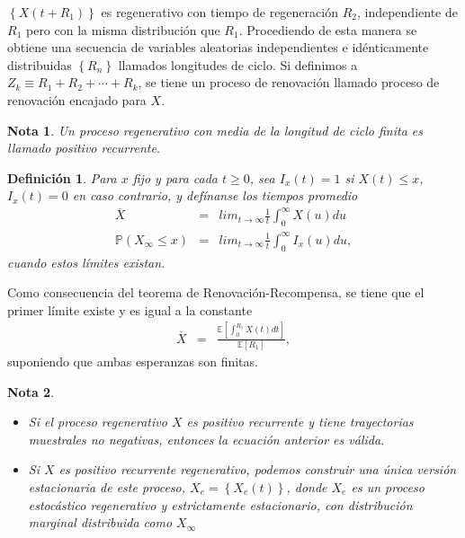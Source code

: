 \documentclass{article}
\newtheorem{Def}{Definición}[section]
\newtheorem{Note}{Nota}[section]
\newcommand{\esp}{\mathbb{E}}
\newcommand{\prob}{\mathbb{P}}
\numberwithin{equation}{section}
\begin{document}
$\left\{X\left(t+R_{1}\right)\right\}$ es regenerativo con tiempo de regeneraci\'on $R_{2}$, independiente de $R_{1}$ pero con la misma distribuci\'on que $R_{1}$. Procediendo de esta manera se obtiene una secuencia de variables aleatorias independientes e id\'enticamente distribuidas $\left\{R_{n}\right\}$ llamados longitudes de ciclo. Si definimos a $Z_{k}\equiv R_{1}+R_{2}+\cdots+R_{k}$, se tiene un proceso de renovaci\'on llamado proceso de renovaci\'on encajado para $X$.

\begin{Note}
Un proceso regenerativo con media de la longitud de ciclo finita es llamado positivo recurrente.
\end{Note}


\begin{Def}
Para $x$ fijo y para cada $t\geq0$, sea $I_{x}\left(t\right)=1$ si $X\left(t\right)\leq x$,  $I_{x}\left(t\right)=0$ en caso contrario, y def\'inanse los tiempos promedio
\begin{eqnarray*}
\overline{X}&=&lim_{t\rightarrow\infty}\frac{1}{t}\int_{0}^{\infty}X\left(u\right)du\\
\prob\left(X_{\infty}\leq x\right)&=&lim_{t\rightarrow\infty}\frac{1}{t}\int_{0}^{\infty}I_{x}\left(u\right)du,
\end{eqnarray*}
cuando estos l\'imites existan.
\end{Def}

Como consecuencia del teorema de Renovaci\'on-Recompensa, se tiene que el primer l\'imite  existe y es igual a la constante
\begin{eqnarray*}
\overline{X}&=&\frac{\esp\left[\int_{0}^{R_{1}}X\left(t\right)dt\right]}{\esp\left[R_{1}\right]},
\end{eqnarray*}
suponiendo que ambas esperanzas son finitas.

\begin{Note}
\begin{itemize}
\item[a)] Si el proceso regenerativo $X$ es positivo recurrente y tiene trayectorias muestrales no negativas, entonces la ecuaci\'on anterior es v\'alida.
\item[b)] Si $X$ es positivo recurrente regenerativo, podemos construir una \'unica versi\'on estacionaria de este proceso, $X_{e}=\left\{X_{e}\left(t\right)\right\}$, donde $X_{e}$ es un proceso estoc\'astico regenerativo y estrictamente estacionario, con distribuci\'on marginal distribuida como $X_{\infty}$
\end{itemize}
\end{Note}
\end{document}
